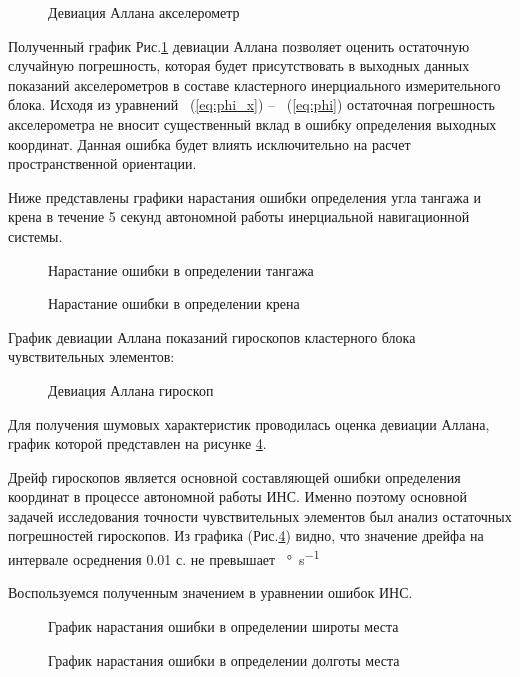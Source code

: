 \newpage

\begin{figure}[h]
	\caption{Девиация Аллана акселерометр}
	\label{fig:dev_acc}
\end{figure}


Полученный график Рис.\ref{fig:dev_acc} девиации Аллана позволяет оценить остаточную случайную погрешность, которая будет присутствовать в выходных данных показаний акселерометров в составе кластерного инерциального измерительного блока. Исходя из уравнений ~(\ref{eq:phi_x}) -- ~(\ref{eq:phi}) остаточная погрешность акселерометра не вносит существенный вклад в ошибку определения выходных координат. Данная ошибка будет влиять исключительно на расчет пространственной ориентации.  


Ниже представлены графики нарастания ошибки определения угла тангажа и крена в течение 5 секунд автономной работы инерциальной навигационной системы. 

\newpage

\begin{figure}[h]
	\caption{Нарастание ошибки в определении тангажа}
	\label{fig:pitch}
\end{figure}


\begin{figure}[h]
	\caption{Нарастание ошибки в определении крена}
	\label{fig:roll}
\end{figure}


График девиации Аллана показаний гироскопов кластерного блока чувствительных элементов: 

\begin{figure}[h]
	\caption{Девиация Аллана гироскоп}
	\label{fig:dev_gyr}
\end{figure}

Для получения шумовых характеристик проводилась оценка девиации Аллана, график которой представлен на рисунке \ref{fig:dev_gyr}. 


Дрейф гироскопов является основной составляющей ошибки определения координат в процессе автономной работы ИНС. Именно поэтому основной задачей исследования точности чувствительных элементов был анализ остаточных погрешностей гироскопов. Из графика (Рис.\ref{fig:dev_gyr}) видно, что значение дрейфа на интервале осреднения 0.01 с. не превышает \SI[per-mode=symbol]{}{\degree\per\second}


Воспользуемся полученным значением в уравнении ошибок ИНС.

\begin{figure}[h!]
	\caption{График нарастания ошибки в определении широты места}
	\label{fig:lat_error}
\end{figure}


\begin{figure}[h!]
	\caption{График нарастания ошибки в определении долготы места}
	\label{fig:long_error}
\end{figure}